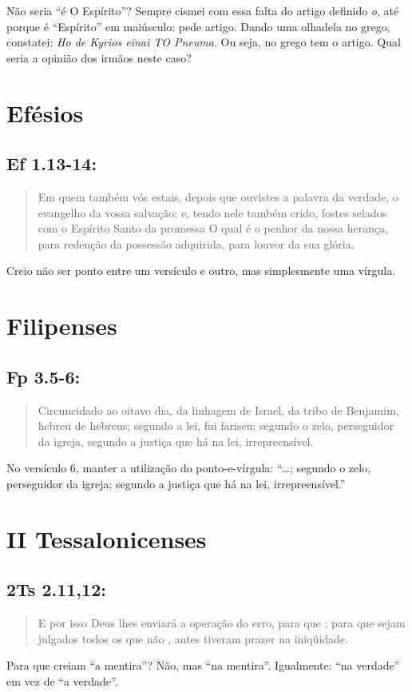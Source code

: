 Não seria ``é O Espírito''? Sempre cismei com essa falta do artigo definido \emph{o}, até porque é ``Espírito'' em maiúsculo: pede artigo. Dando uma olhadela no grego, constatei: \textit{Ho de Kyrios einai TO Pneuma}. Ou seja, no grego tem o artigo. Qual seria a opinião dos irmãos neste caso?

\section{Efésios}
\subsection{Ef 1.13-14:}
\begin{quote}
    \small
Em quem também vós estais, depois que  ouvistes a palavra da verdade, o evangelho da vossa salvação; e,  tendo nele também crido, fostes selados com o Espírito Santo da
promessa O qual é o penhor da nossa  herança, para redenção da possessão adquirida, para louvor da sua  glória.
\end{quote}

Creio não ser ponto entre um versículo e outro, mas simplesmente uma vírgula.

\section{Filipenses}
\subsection{Fp 3.5-6:}
\begin{quote}
    \small
Circuncidado ao oitavo dia, da linhagem de Israel, da tribo de Benjamim, hebreu de hebreus; segundo a lei, fui fariseu; segundo o zelo, perseguidor da  igreja, segundo a justiça que há na lei, irrepreensível.
\end{quote}

No versículo 6, manter a utilização do ponto-e-vírgula: ``\ldots{}; segundo o zelo, perseguidor da igreja; segundo a justiça que há na lei, irrepreensível.''

\section{II Tessalonicenses}
\subsection{2Ts 2.11,12:}
\begin{quote}
    \small
E por isso Deus lhes enviará a
operação do erro, para que ; para que sejam julgados todos os que não , antes tiveram prazer na iniqüidade.
\end{quote}
Para que creiam ``a mentira''? Não, mas ``na mentira''. Igualmente: ``na verdade'' em vez de ``a verdade''.


